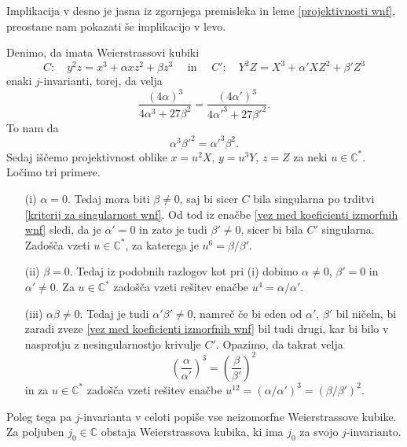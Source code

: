 \documentclass[mat1]{fmfdelo}
\numberwithin{equation}{section}
\newcommand{\C}{\mathbb C}
\newcommand{\CM}{\mathbb C ^*}
\theoremstyle{definition}
\begin{document}
\begin{dokaz}
    Implikacija v desno je jasna iz zgornjega premisleka in leme \ref{projektivnosti wnf}, preostane nam pokazati še implikacijo v levo. 

    Denimo, da imata Weierstrassovi kubiki
    \[
        C: \quad y^2z = x^3 + \alpha xz^2 + \beta z^3 \quad \text{ in } \quad
        C': \quad Y^2Z = X^3 + \alpha' XZ^2 + \beta' Z^3 
    \]
    enaki $j$-invarianti, torej, da velja
    \[
        \frac{(4\alpha)^3}{4\alpha^3 + 27\beta^2} = \frac{(4\alpha')^3}{4\alpha'^3 + 27\beta'^2}.
    \]
    To nam da
    \begin{equation}
        \label{vez med koeficienti izmorfnih wnf}
        \alpha^3 \beta'^2 = \alpha'^3 \beta^2.
    \end{equation}
    Sedaj iščemo projektivnost oblike 
    $x = u^2 X$, $y = u^3 Y$, $z = Z$ 
    za neki $u \in \CM$. Ločimo tri primere.

    \begin{itemize}
        \item[(i)]
        $\alpha = 0$. Tedaj mora biti $\beta \neq 0$, saj bi sicer $C$ bila singularna po trditvi \ref{kriterij za singularnost wnf}. Od tod iz enačbe \eqref{vez med koeficienti izmorfnih wnf} sledi, da je $\alpha' = 0$ in zato je tudi $\beta' \neq 0$, sicer bi bila $C'$ singularna. Zadošča vzeti $u \in \CM$, za katerega je $u^6 = \beta/\beta'$.
        \item[(ii)]
        $\beta = 0$. Tedaj iz podobnih razlogov kot pri (i) dobimo $\alpha \neq 0$, $\beta' = 0$ in $\alpha' \neq 0$. Za $u \in \CM$ zadošča vzeti rešitev enačbe $u^4 = \alpha/\alpha'$.
        \item[(iii)]
        $\alpha\beta \neq 0$. Tedaj je tudi $\alpha'\beta' \neq 0$, namreč če bi eden od $\alpha'$, $\beta'$ bil ničeln, bi zaradi zveze \eqref{vez med koeficienti izmorfnih wnf} bil tudi drugi, kar bi bilo v nasprotju z nesingularnostjo krivulje $C'$. Opazimo, da takrat velja
        \[
            \left(\frac{\alpha}{\alpha'}\right)^3 = \left(\frac{\beta}{\beta'}\right)^2
        \]
        in za $u \in \CM$ zadošča vzeti rešitev enačbe $u^{12} = (\alpha/\alpha')^3 = (\beta/\beta')^2$. \qedhere
    \end{itemize}
\end{dokaz}

Poleg tega pa $j$-invarianta v celoti popiše vse neizomorfne Weierstrassove kubike. Za poljuben $j_0 \in \C$ obstaja Weierstrassova kubika, ki ima $j_0$ za svojo $j$-invarianto.
\end{document}
